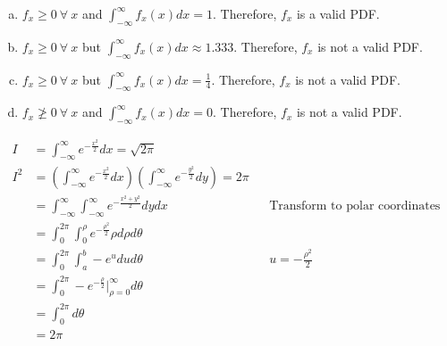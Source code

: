 \documentclass[12pt]{article}
\newenvironment{problem}[2][Problem]{\begin{trivlist}
\item[\hskip \labelsep {\bfseries #1}\hskip \labelsep {\bfseries #2.}]
  \vspace{1 cm}
}{\end{trivlist}}
\begin{document}
\begin{problem}{3.17}
\item
  \begin{enumerate}[a.]
    \item %
      $f_x \geq 0 \ \forall \ x$ and $\int_{-\infty}^{\infty} f_x(x)dx = 1$.
      Therefore, $f_x$ is a valid PDF.
    \item %
      $f_x \geq 0 \ \forall \ x$ but $\int_{-\infty}^{\infty} f_x(x)dx \approx 1.333$.
      Therefore, $f_x$ is not a valid PDF.
    \item %
      $f_x \geq 0 \ \forall \ x$ but $\int_{-\infty}^{\infty} f_x(x)dx =
      \frac{1}{4}$. Therefore, $f_x$ is not a valid PDF.
    \item %
      $f_x \ngeq 0 \ \forall \ x$ and $\int_{-\infty}^{\infty} f_x(x)dx = 0$.
      Therefore, $f_x$ is not a valid PDF.
  \end{enumerate}
\end{problem}

\begin{problem}{3.19}
\item %
  \begin{align*}
    I &= \int_{-\infty}^{\infty} e^{-\frac{x^2}{2}}dx = \sqrt{2\pi} \\
    I^2 &= \left(\int_{-\infty}^{\infty} e^{-\frac{x^2}{2}}dx \right)
    \left( \int_{-\infty}^{\infty} e^{-\frac{y^2}{2}}dy \right) = 2\pi \\
    &= \int_{-\infty}^{\infty} \int_{-\infty}^{\infty} e^{-\frac{x^2+y^2}{2}}dydx
    & & \textrm{Transform to polar coordinates} \\
    &= \int_{0}^{2\pi} \int_{0}^{\rho} e^{-\frac{\rho^2}{2}}\rho d\rho d\theta \\
    &= \int_{0}^{2\pi} \int_{a}^{b} -e^{u}du d\theta & & u = -\frac{\rho^2}{2} \\
    &= \int_{0}^{2\pi} -e^{-\frac{\rho}{2}} \big|_{\rho = 0}^{\infty} d\theta \\
    &= \int_{0}^{2\pi} d\theta \\
    &= 2\pi
  \end{align*}
\end{problem}
\end{document}

